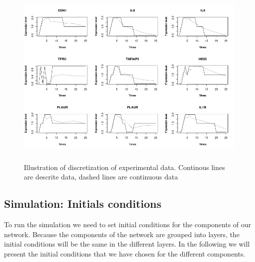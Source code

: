 \begin{figure}[!t]
 \centering
 \includegraphics[width=6.5in,height=3.5in]{images/ResultDiscretization.png}
 \caption{Illustration of discretization of experimental data. Continous lines are descrite data, dashed lines are continuous data}
 \label{fig:illustrationDiscretisation}
\end{figure}

  


\subsection{Simulation: Initials conditions}
To run the simulation we need to set initial conditions for the components of our network. Because the components of the network are grouped into 
layers, the initial conditions will be the same in the different layers. In the following we will present the initial conditions that we have chosen for the different 
components.

